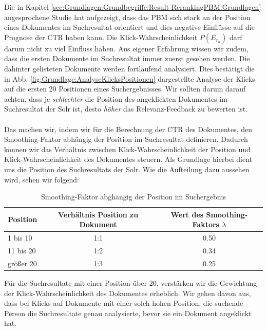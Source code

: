 Die in Kapitel \ref{sec:Grundlagen:Grundbegriffe:Result-RerankingPBM:Grundlagen} angesprochene Studie \cite{pbm} hat aufgezeigt, dass das PBM sich stark an der Position eines Dokumentes im Suchresultat orientiert und dies negative Einflüsse auf die Prognose der CTR haben kann. Die Klick-Wahrscheinlichkeit $P(E_{r_{u}})$ darf darum nicht zu viel Einfluss haben. Aus eigener Erfahrung wissen wir zudem, dass die ersten Dokumente im Suchresultat immer zuerst gesehen werden. Die dahinter gelisteten Dokumente werden fortlaufend analysiert. Dies bestätigt die in Abb. \ref{fig:Grundlage:AnalyseKlicksPositionen} dargestellte Analyse der Klicks auf die ersten 20 Positionen eines Suchergebnisses. Wir sollten darum darauf achten, dass je \textit{schlechter} die Position des angeklickten Dokumentes im Suchresultat der Solr ist, desto \textit{höher} das Relevanz-Feedback zu bewerten ist. 
\\
\\
Das machen wir, indem wir für die Berechnung der CTR des Dokumentes, den Smoothing-Faktor abhängig der Position im Suchresultat definieren. Dadurch können wir das Verhältnis zwischen Klick-Wahrscheinlichkeit der Position und Klick-Wahrscheinlichkeit des Dokumentes steuern. Als Grundlage hierbei dient uns die Position des Suchresultats der Solr. Wie die Aufteilung dazu aussehen wird, sehen wir folgend:

\begin{table}[H]
\centering
\vspace{-.75em}
 \caption[Smoothing-Faktor abghängig der Position im Suchergebnis]{Smoothing-Faktor abghängig der Position im Suchergebnis}
\label{tab:VerhaeltnisKlick-WahrscheinlichkeitenPositionDokument}
\vspace{-.5em}
\footnotesize
\renewcommand*{\arraystretch}{1.2}
\begin{tabular}{lcc} \hline
	\textbf{Position} & \textbf{Verhältnis Position zu Dokument} & \textbf{Wert des Smoothing-Faktors $\lambda$}\\ \hline
	1 bis 10 & 1:1 & 0.50\\ \hline
	11 bis 20 & 1:2 & 0.34\\ \hline
	größer 20 &  1:3 & 0.25\\ \hline
 \end{tabular}
\vspace{-2em}
\end{table}

Für die Suchresultate mit einer Position über 20, verstärken wir die Gewichtung der Klick-Wahrscheinlichkeit des Dokumentes erheblich. Wir gehen davon aus, dass bei Klicks auf Dokumente mit einer solch hohen Position, die suchende Person die Suchresultate genau analysierte, bevor sie ein Dokument angeklickt hat.

